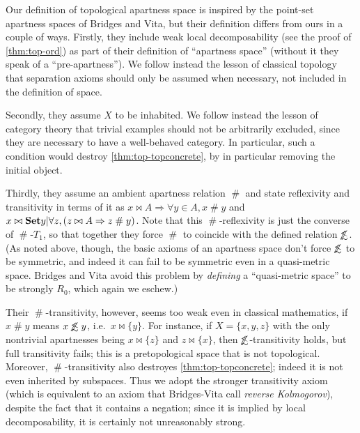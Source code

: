 \documentclass{article}
\def\apart{\mathrel{\#}}
\def\oapt{\mathrel{\!\not\,\not\lesssim}}
\let\implies\Rightarrow
\def\singleton#1{\{#1\}}
\begin{document}
\begin{rmk}
  Our definition of topological apartness space is inspired by the point-set apartness spaces of Bridges and Vita, but their definition differs from ours in a couple of ways.
  Firstly, they include weak local decomposability (see the proof of \cref{thm:top-ord}) as part of their definition of ``apartness space'' (without it they speak of a ``pre-apartness'').
  We follow instead the lesson of classical topology that separation axioms should only be assumed when necessary, not included in the definition of space.
  
  Secondly, they assume $X$ to be inhabited.
  We follow instead the lesson of category theory that trivial examples should not be arbitrarily excluded, since they are necessary to have a well-behaved category.
  In particular, such a condition would destroy \cref{thm:top-topconcrete}, by in particular removing the initial object.

  Thirdly, they assume an ambient apartness relation $\apart$ and state reflexivity and transitivity in terms of it as $x\bowtie A \implies \forall y\in A, x\apart y$ and $x \bowtie \setof{ y | \forall z, (z\bowtie A \implies z\apart y)}$.
  Note that this $\apart$-reflexivity is just the converse of $\apart$-$T_1$, so that together they force $\apart$ to coincide with the defined relation $\oapt$.
  (As noted above, though, the basic axioms of an apartness space don't force $\oapt$ to be symmetric, and indeed it can fail to be symmetric even in a quasi-metric space.
  Bridges and Vita avoid this problem by \emph{defining} a ``quasi-metric space'' to be strongly $R_0$, which again we eschew.)

  Their $\apart$-transitivity, however, seems too weak even in classical mathematics, if $x\apart y$ means $x\oapt y$, i.e.\ $x\bowtie \singleton{y}$.
  For instance, if $X = \{x,y,z\}$ with the only nontrivial apartnesses being $x\bowtie \singleton{z}$ and $z\bowtie \singleton{x}$, then $\oapt$-transitivity holds, but full transitivity fails; this is a pretopological space that is not topological.
  Moreover, $\apart$-transitivity also destroyes \cref{thm:top-topconcrete}; indeed it is not even inherited by subspaces.
  Thus we adopt the stronger transitivity axiom (which is equivalent to an axiom that Bridges-Vita call \emph{reverse Kolmogorov}), despite the fact that it contains a negation; since it is implied by local decomposability, it is certainly not unreasonably strong.
\end{rmk}
\end{document}
